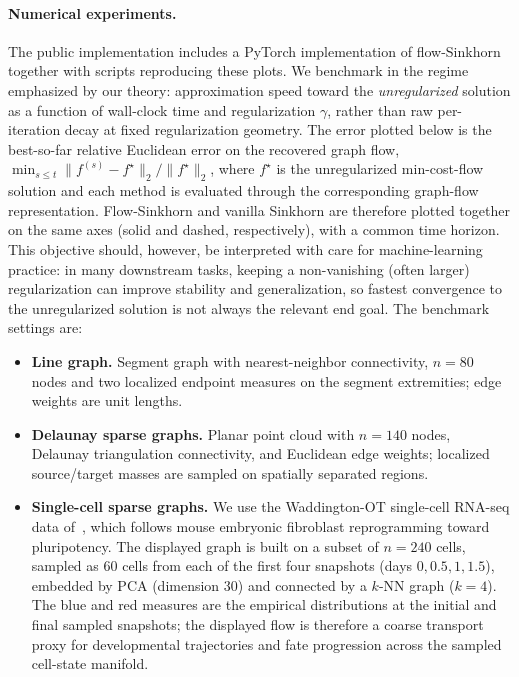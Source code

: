 \documentclass{article}
\theoremstyle{plain}
\begin{document}
\paragraph{Numerical experiments.}
The public implementation includes a PyTorch implementation of flow-Sinkhorn together with scripts reproducing these plots. We benchmark in the regime emphasized by our theory: approximation speed toward the \emph{unregularized} solution as a function of wall-clock time and regularization $\gamma$, rather than raw per-iteration decay at fixed regularization geometry. The error plotted below is the best-so-far relative Euclidean error on the recovered graph flow, $\min_{s\le t}\|f^{(s)}-f^\star\|_2/\|f^\star\|_2$, where $f^\star$ is the unregularized min-cost-flow solution and each method is evaluated through the corresponding graph-flow representation. Flow-Sinkhorn and vanilla Sinkhorn are therefore plotted together on the same axes (solid and dashed, respectively), with a common time horizon. This objective should, however, be interpreted with care for machine-learning practice: in many downstream tasks, keeping a non-vanishing (often larger) regularization can improve stability and generalization, so fastest convergence to the unregularized solution is not always the relevant end goal.
%
The benchmark settings are:
\begin{itemize}[leftmargin=1.2em,itemsep=1pt,topsep=2pt,parsep=0pt,partopsep=0pt]
\item \textbf{Line graph.} Segment graph with nearest-neighbor connectivity, $n=80$ nodes and two localized endpoint measures on the segment extremities; edge weights are unit lengths.
\item \textbf{Delaunay sparse graphs.} Planar point cloud with $n=140$ nodes, Delaunay triangulation connectivity, and Euclidean edge weights; localized source/target masses are sampled on spatially separated regions.
\item \textbf{Single-cell sparse graphs.} We use the Waddington-OT single-cell RNA-seq data of~\citet{schiebinger2019optimal}, which follows mouse embryonic fibroblast reprogramming toward pluripotency. The displayed graph is built on a subset of $n=240$ cells, sampled as $60$ cells from each of the first four snapshots (days $0,0.5,1,1.5$), embedded by PCA (dimension $30$) and connected by a $k$-NN graph ($k=4$). The blue and red measures are the empirical distributions at the initial and final sampled snapshots; the displayed flow is therefore a coarse transport proxy for developmental trajectories and fate progression across the sampled cell-state manifold.
\end{itemize}
\end{document}
